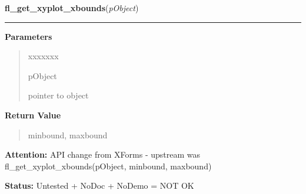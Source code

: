     \label{xformslib:library:fl_get_xyplot_xbounds}

    \vspace{0.5ex}

\hspace{.8\funcindent}\begin{boxedminipage}{\funcwidth}

    \raggedright \textbf{fl\_get\_xyplot\_xbounds}(\textit{pObject})

    \vspace{-1.5ex}

    \rule{\textwidth}{0.5\fboxrule}
\setlength{\parskip}{2ex}
\setlength{\parskip}{1ex}
      \textbf{Parameters}
      \vspace{-1ex}

      \begin{quote}
        \begin{Ventry}{xxxxxxx}

          \item[pObject]

          pointer to object

        \end{Ventry}

      \end{quote}

      \textbf{Return Value}
    \vspace{-1ex}

      \begin{quote}
      minbound, maxbound

      \end{quote}

\textbf{Attention:} API change from XForms - upstream was fl\_get\_xyplot\_xbounds(pObject, 
minbound, maxbound)



\textbf{Status:} Untested + NoDoc + NoDemo = NOT OK



    \end{boxedminipage}

    \label{xformslib:library:fl_get_xyplot_ybounds}

    \vspace{0.5ex}

